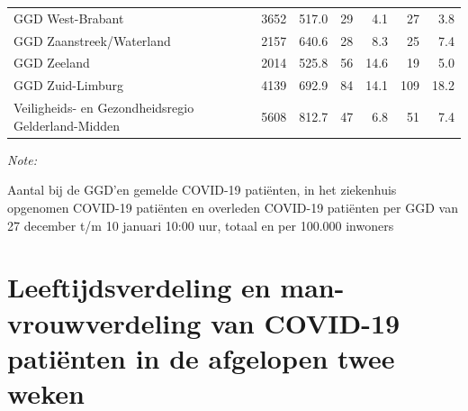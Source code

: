\documentclass[
  english,
  man,floatsintext]{apa6}
\begin{document}
\begin{table}[H]
\begin{threeparttable}
\begin{tabular}{lrrrrrr}
GGD West-Brabant & 3652 & 517.0 & 29 & 4.1 & 27 & 3.8\\
GGD Zaanstreek/Waterland & 2157 & 640.6 & 28 & 8.3 & 25 & 7.4\\
GGD Zeeland & 2014 & 525.8 & 56 & 14.6 & 19 & 5.0\\
GGD Zuid-Limburg & 4139 & 692.9 & 84 & 14.1 & 109 & 18.2\\
Veiligheids- en Gezondheidsregio Gelderland-Midden & 5608 & 812.7 & 47 & 6.8 & 51 & 7.4\\
\bottomrule
\end{tabular}
\begin{tablenotes}
\item \textit{Note: } 
\item Aantal bij de GGD’en gemelde COVID-19 patiënten, in het ziekenhuis opgenomen COVID-19 patiënten en overleden COVID-19 patiënten per GGD van 27 december t/m 10 januari 10:00 uur, totaal en per 100.000 inwoners
\end{tablenotes}
\end{threeparttable}
\endgroup{}
\end{table}

\newpage

\hypertarget{leeftijdsverdeling-en-man-vrouwverdeling-van-covid-19-patiuxebnten-in-de-afgelopen-twee-weken}{%
\section{Leeftijdsverdeling en man-vrouwverdeling van COVID-19 patiënten in de afgelopen twee weken}\label{leeftijdsverdeling-en-man-vrouwverdeling-van-covid-19-patiuxebnten-in-de-afgelopen-twee-weken}}
\end{document}
